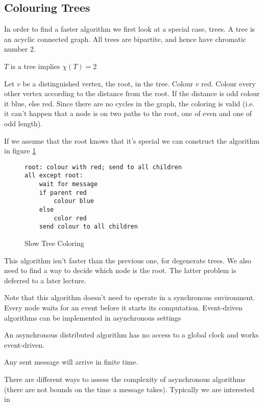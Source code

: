 \subsection{Colouring Trees}

In order to find a faster algorithm we first look at a special case, trees. A tree is an acyclic connected graph. All trees are bipartite, and hence have chromatic number 2.

\begin{thm} $T$ is a tree implies $\chi(T)=2$ \end{thm}

\begin{pr} Let $v$ be a distinguished vertex, the root, in the tree. Colour $v$ red.  Colour every other vertex according to the distance from the root. If the distance is odd colour it blue, else red. Since there are no cycles in the graph, the coloring is valid (i.e. it can't happen that a node is on two paths to the root, one of even and one of odd length).
\end{pr}

If we assume that the root knows that it's special we can construct the algorithm in figure \ref{alg:slow_tree_colour}

\begin{figure}[hbt]
\begin{lstlisting}
root: colour with red; send to all children
all except root: 
	wait for message
	if parent red
		colour blue
	else
		color red
	send colour to all children
\end{lstlisting}
\caption{Slow Tree Coloring}
\label{alg:slow_tree_colour}
\end{figure}


This algorithm isn't faster than the previous one, for degenerate trees. We also need to find a way to decide which node is the root. The latter problem is deferred to a later lecture.

Note that this algorithm doesn't need to operate in a synchronous environment. Every node waits for an event before it starts its computation. Event-driven algorithms can be implemented in asynchronous settings

\begin{Def}[Asynchronous DA] An asynchronous distributed algorithm has no access to a global clock and works event-driven.

Any sent message will arrive in finite time.
\end{Def}

There are different ways to assess the complexity of asynchronous algorithms (there are not bounds on the time a message takes). Typically we are interested in 

